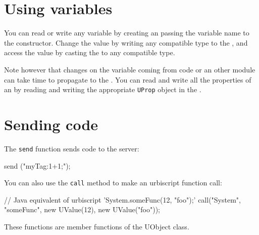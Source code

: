 \section{Using \urbi variables}
\label{sec:uob:apijava:uvar}

You can read or write any \urbi variable by creating an \UVar passing the
variable name to the constructor. Change the value by writing any compatible
type to the \UVar, and access the value by casting the \UVar to any
compatible type.

Note however that changes on the variable coming from \urbi code or an other
module can take time to propagate to the \UVar.  You can read and write all
the \urbi properties of an \UVar by reading and writing the appropriate
\lstinline{UProp} object in the \UVar.

\section{Sending \urbi code}
\label{sec:uob:apijava:sendcode}

The \lstinline{send} function sends \urbi code to the server:

\begin{urbiunchecked}
send ("myTag:1+1;");
\end{urbiunchecked}

You can also use the \lstinline{call} method to make an urbiscript function
call:

\begin{urbiunchecked}
// Java equivalent of urbiscript 'System.someFunc(12, "foo");'
call("System", "someFunc", new UValue(12), new UValue("foo"));
\end{urbiunchecked}

These functions are member functions of the UObject class.


